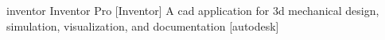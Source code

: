 \newglsXsoftware%
{inventor}%
{Inventor Pro\textsuperscript{\textregistered}}%
[Inventor]%
{A \gls{cad} application for \gls{3d} mechanical design, simulation, visualization, and documentation \cite{website:Autodesk:Inventor}}%
[autodesk]%